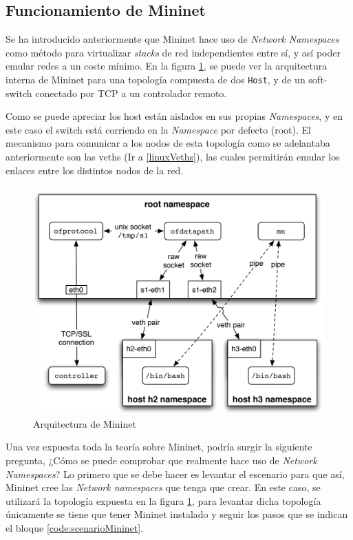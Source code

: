 \subsection{Funcionamiento de Mininet}

Se ha introducido anteriormente que Mininet hace uso de \textit{Network Namespaces} como método para virtualizar \textit{stacks} de red independientes entre sí, y así poder emular redes a un coste mínimo. En la figura \ref{fig:mininet_arch}, se puede ver la arquitectura interna de Mininet para una topología compuesta de dos \texttt{Host}, y de un soft-switch conectado por TCP a un controlador remoto.\\
\par
Como se puede apreciar los host están aislados en sus propias \textit{Namespaces}, y en este caso el switch está corriendo en la \textit{Namespace} por defecto (root). El mecanismo para comunicar a los nodos de esta topología como se adelantaba anteriormente son las \gls{veth}s (Ir a \ref{linuxVeths}), las cuales permitirán emular los enlaces entre los distintos nodos de la red.\\


\begin{figure}[ht]
    \centering
    \includegraphics[width=11.5cm]{archivos/img/teoria/mn_arch.png}
    \caption{Arquitectura de Mininet \cite{heller2013reproducible}}
    \label{fig:mininet_arch}
\end{figure}

Una vez expuesta toda la teoría sobre Mininet, podría surgir la siguiente pregunta, ¿Cómo se puede comprobar que realmente hace uso de \textit{Network Namespaces}? Lo primero que se debe hacer es levantar el escenario para que así, Mininet cree las \textit{Network namespaces} que tenga que crear. En este caso, se utilizará la topología expuesta en la figura \ref{fig:mininet_arch}, para levantar dicha topología únicamente se tiene que tener Mininet instalado y seguir los pasos que se indican el bloque \ref{code:scenarioMininet}. 


